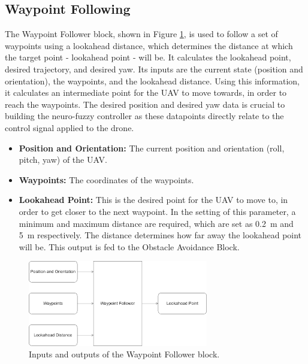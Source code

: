 \subsection{Waypoint Following}
The Waypoint Follower block, shown in Figure \ref{fig:wp_follower}, is used to follow a set of waypoints using a lookahead distance, which determines the distance at which the target point - lookahead point - will be. It calculates the lookahead point, desired trajectory, and desired yaw. Its inputs are the current state (position and orientation), the waypoints, and the lookahead distance. Using this information, it calculates an intermediate point for the UAV to move towards, in order to reach the waypoints. The desired position and desired yaw data is crucial to building the neuro-fuzzy controller as these datapoints directly relate to the control signal applied to the drone.
\begin{itemize}
    \item \textbf{Position and Orientation:} The current position and orientation (roll, pitch, yaw) of the UAV.
    \item \textbf{Waypoints:} The coordinates of the waypoints.
    \item \textbf{Lookahead Point:} This is the desired point for the UAV to move to, in order to get closer to the next waypoint. In the setting of this parameter, a minimum and maximum distance are required, which are set as \SI{0.2}{\meter} and \SI{5}{\meter} respectively. The distance determines how far away the lookahead point will be. This output is fed to the Obstacle Avoidance Block.
\end{itemize} 
\begin{figure}[H]
    \centering
    \includegraphics[width = 0.7\textwidth]{./img/wp_follower.png}
    \caption{Inputs and outputs of the Waypoint Follower block.}
    \label{fig:wp_follower}
\end{figure}
